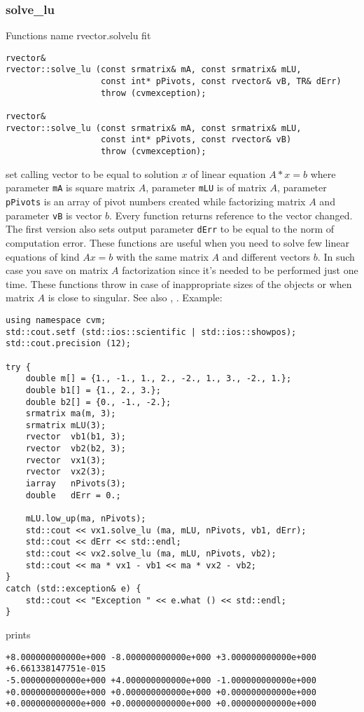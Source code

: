 \subsubsection{solve\_lu}
Functions%
\pdfdest name {rvector.solvelu} fit
\begin{verbatim}
rvector& 
rvector::solve_lu (const srmatrix& mA, const srmatrix& mLU, 
                   const int* pPivots, const rvector& vB, TR& dErr)
                   throw (cvmexception);

rvector&
rvector::solve_lu (const srmatrix& mA, const srmatrix& mLU, 
                   const int* pPivots, const rvector& vB)
                   throw (cvmexception);
\end{verbatim}
set calling vector to be equal to solution $x$ of linear equation
$A*x=b$ where parameter \verb"mA" is  square matrix $A$,
parameter \verb"mLU" is 
of  matrix $A$, parameter \verb"pPivots" is an array of pivot numbers
created while factorizing  matrix $A$
and parameter \verb"vB" is  vector $b$.
Every function returns  reference to the vector changed.
The first version also sets output parameter \verb"dErr" to be equal
to the norm of computation error.
These functions are useful when you need to solve few linear equations
of kind $Ax=b$ with the same matrix $A$ and different vectors $b$.
In such case you save on matrix $A$ factorization since it's needed to be
performed just one time.
These functions throw 
in case of inappropriate sizes
of the objects or when  matrix $A$ is close to singular.
See also , .
Example:
\begin{Verbatim}
using namespace cvm;
std::cout.setf (std::ios::scientific | std::ios::showpos);
std::cout.precision (12);

try {
    double m[] = {1., -1., 1., 2., -2., 1., 3., -2., 1.};
    double b1[] = {1., 2., 3.};
    double b2[] = {0., -1., -2.};
    srmatrix ma(m, 3);
    srmatrix mLU(3);
    rvector  vb1(b1, 3);
    rvector  vb2(b2, 3);
    rvector  vx1(3);
    rvector  vx2(3);
    iarray   nPivots(3);
    double   dErr = 0.;

    mLU.low_up(ma, nPivots);
    std::cout << vx1.solve_lu (ma, mLU, nPivots, vb1, dErr);
    std::cout << dErr << std::endl;
    std::cout << vx2.solve_lu (ma, mLU, nPivots, vb2);
    std::cout << ma * vx1 - vb1 << ma * vx2 - vb2;
}
catch (std::exception& e) {
    std::cout << "Exception " << e.what () << std::endl;
}
\end{Verbatim}
prints
\begin{Verbatim}
+8.000000000000e+000 -8.000000000000e+000 +3.000000000000e+000
+6.661338147751e-015
-5.000000000000e+000 +4.000000000000e+000 -1.000000000000e+000
+0.000000000000e+000 +0.000000000000e+000 +0.000000000000e+000
+0.000000000000e+000 +0.000000000000e+000 +0.000000000000e+000
\end{Verbatim}
\newpage




